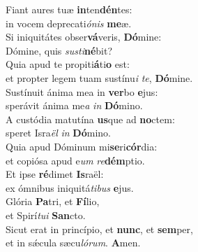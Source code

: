 \evenverse Fiant aures tuæ \textbf{in}ten\textbf{dén}tes:~\*\\
\evenverse in vocem deprecati\textit{ó}\textit{nis} \textbf{me}æ.\\
\oddverse Si iniquitátes obser\textbf{vá}veris, \textbf{Dó}mine:~\*\\
\oddverse Dómine, quis \textit{su}\textit{sti}\textbf{né}bit?\\
\evenverse Quia apud te propiti\textbf{á}ti\textbf{o} est:~\*\\
\evenverse et propter legem tuam sustínu\textit{i} \textit{te}, \textbf{Dó}mine.\\
\oddverse Sustínuit ánima mea in \textbf{ver}bo \textbf{e}jus:~\*\\
\oddverse sperávit ánima me\textit{a} \textit{in} \textbf{Dó}mino.\\
\evenverse A custódia matutína \textbf{us}que ad \textbf{no}ctem:~\*\\
\evenverse speret Isra\textit{ël} \textit{in} \textbf{Dó}mino.\\
\oddverse Quia apud Dóminum mi\textbf{se}ri\textbf{cór}dia:~\*\\
\oddverse et copiósa apud e\textit{um} \textit{re}\textbf{dém}ptio.\\
\evenverse Et ipse \textbf{ré}dimet \textbf{Is}raël:~\*\\
\evenverse ex ómnibus iniquitá\textit{ti}\textit{bus} \textbf{e}jus.\\
\oddverse Glória \textbf{Pa}tri, et \textbf{Fí}lio,~\*\\
\oddverse et Spirí\textit{tu}\textit{i} \textbf{San}cto.\\
\evenverse Sicut erat in princípio, et \textbf{nunc}, et \textbf{sem}per,~\*\\
\evenverse et in sǽcula sæcu\textit{ló}\textit{rum}. \textbf{A}men.\\
